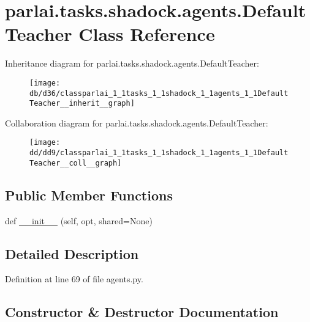 \hypertarget{classparlai_1_1tasks_1_1shadock_1_1agents_1_1DefaultTeacher}{}\section{parlai.\+tasks.\+shadock.\+agents.\+Default\+Teacher Class Reference}
\label{classparlai_1_1tasks_1_1shadock_1_1agents_1_1DefaultTeacher}


Inheritance diagram for parlai.\+tasks.\+shadock.\+agents.\+Default\+Teacher\+:
\nopagebreak
\begin{figure}[H]
\begin{center}
\leavevmode
\texttt{[image: db/d36/classparlai\_1\_1tasks\_1\_1shadock\_1\_1agents\_1\_1DefaultTeacher\_\_inherit\_\_graph]}
\end{center}
\end{figure}


Collaboration diagram for parlai.\+tasks.\+shadock.\+agents.\+Default\+Teacher\+:
\nopagebreak
\begin{figure}[H]
\begin{center}
\leavevmode
\texttt{[image: dd/dd9/classparlai\_1\_1tasks\_1\_1shadock\_1\_1agents\_1\_1DefaultTeacher\_\_coll\_\_graph]}
\end{center}
\end{figure}
\subsection*{Public Member Functions}
\begin{DoxyCompactItemize}
\item 
def \hyperlink{classparlai_1_1tasks_1_1shadock_1_1agents_1_1DefaultTeacher_ac3629b5cf2040dcb6172c276328a3b45}{\+\_\+\+\_\+init\+\_\+\+\_\+} (self, opt, shared=None)
\end{DoxyCompactItemize}


\subsection{Detailed Description}


Definition at line 69 of file agents.\+py.



\subsection{Constructor \& Destructor Documentation}
\mbox{\label{classparlai_1_1tasks_1_1shadock_1_1agents_1_1DefaultTeacher_ac3629b5cf2040dcb6172c276328a3b45}} 
